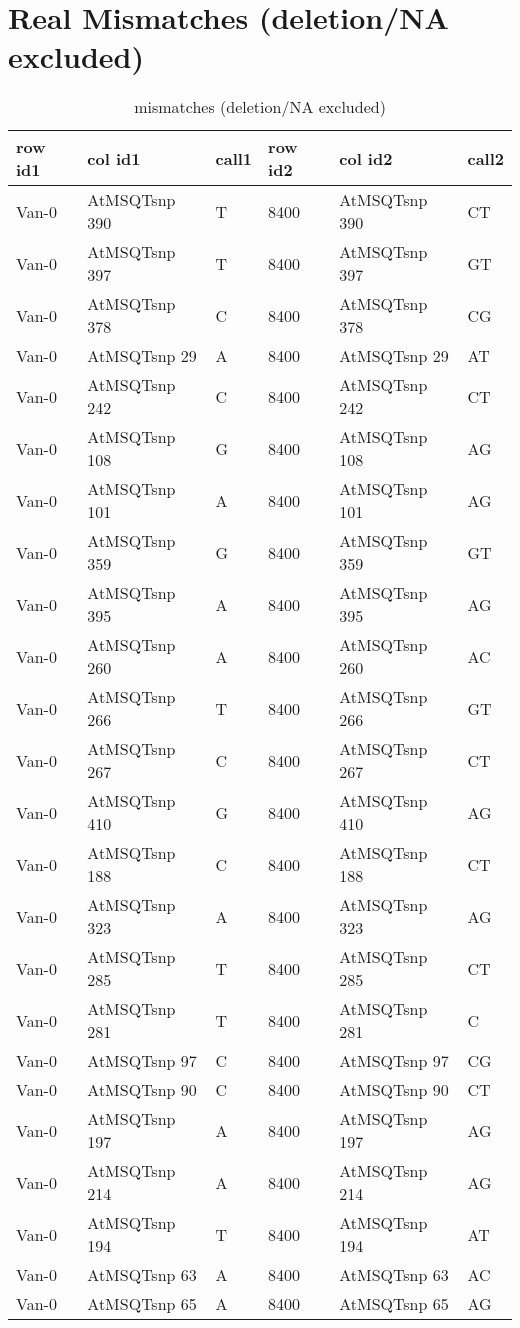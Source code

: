 \section{Real Mismatches (deletion/NA excluded)} \label{section_real_mismatch}
\begin{center}
\begin{longtable}{|l|l|l|l|l|l|}
\caption{mismatches (deletion/NA excluded)} \label{table_dm1}\\
\hline
row id1&col id1&call1&row id2&col id2&call2\\
\hline
Van-0&AtMSQTsnp 390&T&8400&AtMSQTsnp 390&CT\\
Van-0&AtMSQTsnp 397&T&8400&AtMSQTsnp 397&GT\\
Van-0&AtMSQTsnp 378&C&8400&AtMSQTsnp 378&CG\\
Van-0&AtMSQTsnp 29&A&8400&AtMSQTsnp 29&AT\\
Van-0&AtMSQTsnp 242&C&8400&AtMSQTsnp 242&CT\\
Van-0&AtMSQTsnp 108&G&8400&AtMSQTsnp 108&AG\\
Van-0&AtMSQTsnp 101&A&8400&AtMSQTsnp 101&AG\\
Van-0&AtMSQTsnp 359&G&8400&AtMSQTsnp 359&GT\\
Van-0&AtMSQTsnp 395&A&8400&AtMSQTsnp 395&AG\\
Van-0&AtMSQTsnp 260&A&8400&AtMSQTsnp 260&AC\\
Van-0&AtMSQTsnp 266&T&8400&AtMSQTsnp 266&GT\\
Van-0&AtMSQTsnp 267&C&8400&AtMSQTsnp 267&CT\\
Van-0&AtMSQTsnp 410&G&8400&AtMSQTsnp 410&AG\\
Van-0&AtMSQTsnp 188&C&8400&AtMSQTsnp 188&CT\\
Van-0&AtMSQTsnp 323&A&8400&AtMSQTsnp 323&AG\\
Van-0&AtMSQTsnp 285&T&8400&AtMSQTsnp 285&CT\\
Van-0&AtMSQTsnp 281&T&8400&AtMSQTsnp 281&C\\
Van-0&AtMSQTsnp 97&C&8400&AtMSQTsnp 97&CG\\
Van-0&AtMSQTsnp 90&C&8400&AtMSQTsnp 90&CT\\
Van-0&AtMSQTsnp 197&A&8400&AtMSQTsnp 197&AG\\
Van-0&AtMSQTsnp 214&A&8400&AtMSQTsnp 214&AG\\
Van-0&AtMSQTsnp 194&T&8400&AtMSQTsnp 194&AT\\
Van-0&AtMSQTsnp 63&A&8400&AtMSQTsnp 63&AC\\
Van-0&AtMSQTsnp 65&A&8400&AtMSQTsnp 65&AG\\

\end{longtable}
\end{center}
